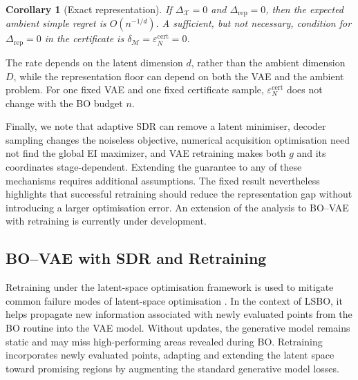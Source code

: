 \documentclass[pdflatex,sn-mathphys-num]{sn-jnl}%
\theoremstyle{thmstyleone}%
\newtheorem{corollary}[theorem]{Corollary}
\theoremstyle{thmstyletwo}%
\theoremstyle{thmstylethree}%
\begin{document}
\begin{corollary}[Exact representation]
\label{cor:fixed-exact-representation}
If $\Delta_{\mathcal{X}}=0$ and $\Delta_{\mathrm{rep}}=0$, then the expected ambient simple regret is $O(n^{-1/d})$.  A sufficient, but not necessary, condition for $\Delta_{\mathrm{rep}}=0$ in the certificate is $\delta_{\mathcal{M}}=\varepsilon_N^{\mathrm{cert}}=0$.
\end{corollary}

The rate depends on the latent dimension $d$, rather than the ambient dimension $D$, while the representation floor can depend on both the VAE and
the ambient problem.  For one fixed VAE and one fixed certificate sample, $\varepsilon_N^{\mathrm{cert}}$ does not change with the BO budget $n$.

Finally, we note that adaptive SDR can remove a latent minimiser, decoder sampling changes the noiseless objective, numerical acquisition optimisation need not find the global EI maximizer, and VAE retraining makes both $g$ and its coordinates stage-dependent.  Extending the
guarantee to any of these mechanisms requires additional assumptions.  The fixed result nevertheless highlights that successful retraining should reduce the representation gap without introducing a larger optimisation error. An extension of the analysis to BO–VAE with retraining is currently under development.

\subsection{BO--VAE with SDR and Retraining}

Retraining under the latent-space optimisation framework is used to mitigate common failure modes of latent-space optimisation \cite{Tripp2020}. In the context of LSBO, it helps propagate new information associated with newly evaluated points from the BO routine into the VAE model. Without updates, the generative model remains static and may miss high-performing areas revealed during BO. Retraining incorporates newly evaluated points, adapting and extending the latent space toward promising regions by augmenting the standard generative model losses.
\end{document}
